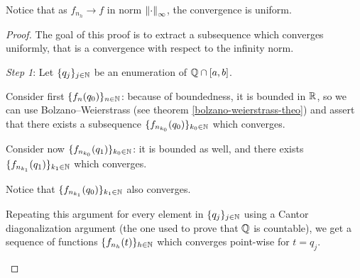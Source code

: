 Notice that as $f_{n_h} \to f$ in norm $\norm{\cdot}_\infty$, the convergence is uniform.


\begin{proof}
	The goal of this proof is to extract a subsequence which converges uniformly, that is a convergence with respect to the infinity norm.
	
	\textit{Step 1}: Let $\{q_j\}_{j\in\NN}$ be an enumeration of $\QQ \cap [a,b]$.
	
	Consider first $\{f_n(q_0)\}_{n \in \NN}$: because of boundedness, it is bounded in $\RR$, so we can use Bolzano--Weierstrass (see theorem \vref{bolzano-weierstrass-theo}) and assert that there exists a subsequence $\{f_{n_{k_0}}(q_0)\}_{k_0\in\NN}$ which converges.
	
	Consider now $\{f_{n_{k_0}}(q_1)\}_{k_0 \in \NN}$: it is bounded as well, and there exists $\{f_{n_{k_1}} (q_1)\}_{k_1 \in \NN}$ which converges.

	Notice that $\{f_{n_{k_1}}(q_0)\}_{k_1 \in \NN}$ also converges.
	
	Repeating this argument for every element in $\{q_j\}_{j \in \NN}$ using a Cantor diagonalization argument (the one used to prove that $\QQ$ is countable), we get a sequence of functions $\{f_{n_h}(t)\}_{h \in \NN}$ which converges point-wise for $t = q_j$.

	\begin{figure}[htpb]
		\centering

		\begin{tikzpicture}[x=0.75pt,y=0.75pt,yscale=-1,xscale=1]


\end{tikzpicture}
\end{figure}
\end{proof}
